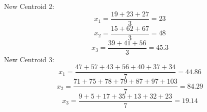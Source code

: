 \documentclass{book}
\begin{document}
\vspace{2mm}
New Centroid 2:
\[
    x_1 = \frac{19 + 23 + 27}{3} = 23
\]
\[
    x_2 = \frac{15 + 62 + 67}{3} = 48
\]
\[
    x_3 = \frac{39 + 41 + 56}{3} = 45.3
\]
\vspace{2mm}
New Centroid 3:
\[
    x_1 = \frac{47 + 57 + 43 + 56 + 40 + 37 + 34}{7} = 44.86
\]
\[
    x_2 = \frac{71 + 75 + 78 + 79 + 87 + 97 + 103}{7} = 84.29
\]
\[
    x_3 = \frac{9 + 5 + 17 + 35 + 13 + 32 + 23}{7} = 19.14
\]
\newpage
\begin{figure}[ht]
    \centering
\end{figure}
\end{document}
